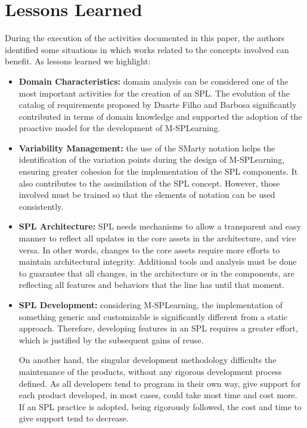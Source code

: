 \section{Lessons Learned}\label{section5}

During the execution of the activities documented in this paper, the authors identified some situations in which works related to the concepts involved can benefit. As lessons learned we highlight:

\begin{itemize}
\item \textbf{Domain Characteristics:} domain analysis can be considered one of the most important activities for the creation of an SPL. The evolution of the catalog of requirements proposed by Duarte Filho and Barbosa \cite{filho13} significantly contributed in terms of domain knowledge and supported the adoption of the proactive model for the development of M-SPLear\allowbreak ning.
    
\item \textbf{Variability Management:} the use of the SMarty notation helps the identification of the variation points during the design of M-SPLear\allowbreak ning, ensuring greater cohesion for the implementation of the SPL components. It also contributes to the assimilation of the SPL concept. However, those involved must be trained so that the elements of notation can be used consistently.
    
\item \textbf{SPL Architecture:} SPL needs mechanisms to allow a transparent and easy manner to reflect all updates in the core assets in the architecture, and vice versa. In other words, changes to the core assets require more efforts to maintain architectural integrity. Additional tools and analysis must be done to guarantee that all changes, in the architecture or in the components, are reflecting all features and behaviors that the line has until that moment.
    
\item \textbf{SPL Development:} considering M-SPLear\allowbreak ning, the implementation of something generic and customizable is significantly different from a static approach. Therefore, developing features in an SPL requires a greater effort, which is justified by the subsequent gains of reuse.

On another hand, the singular development methodology difficults the maintenance of the products, without any rigorous development process defined. As all developers tend to program in their own way, give support for each product developed, in most cases, could take most time and cost more. If an SPL practice is adopted, being rigorously followed, the cost and time to give support tend to decrease.
    

\end{itemize}
